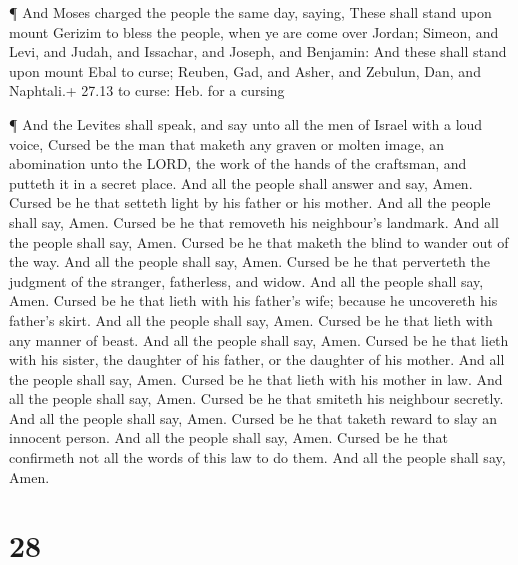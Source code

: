  ¶ And Moses charged the people the same day, saying,
 These shall stand upon mount Gerizim to bless the people,
when ye are come over Jordan; Simeon, and Levi, and Judah, and Issachar,
and Joseph, and Benjamin:  And these shall stand upon mount
Ebal to curse; Reuben, Gad, and Asher, and Zebulun, Dan, and Naphtali.+
27.13 to curse: Heb. for a cursing

 ¶ And the Levites shall speak, and say unto all the men of
Israel with a loud voice,  Cursed be the man that maketh
any graven or molten image, an abomination unto the LORD, the work of
the hands of the craftsman, and putteth it in a secret place. And all
the people shall answer and say, Amen.  Cursed be he that
setteth light by his father or his mother. And all the people shall say,
Amen.  Cursed be he that removeth his neighbour's landmark.
And all the people shall say, Amen.  Cursed be he that
maketh the blind to wander out of the way. And all the people shall say,
Amen.  Cursed be he that perverteth the judgment of the
stranger, fatherless, and widow. And all the people shall say, Amen.
 Cursed be he that lieth with his father's wife; because he
uncovereth his father's skirt. And all the people shall say, Amen.
 Cursed be he that lieth with any manner of beast. And all
the people shall say, Amen.  Cursed be he that lieth with
his sister, the daughter of his father, or the daughter of his mother.
And all the people shall say, Amen.  Cursed be he that
lieth with his mother in law. And all the people shall say, Amen.
 Cursed be he that smiteth his neighbour secretly. And all
the people shall say, Amen.  Cursed be he that taketh
reward to slay an innocent person. And all the people shall say, Amen.
 Cursed be he that confirmeth not all the words of this law
to do them. And all the people shall say, Amen.

\hypertarget{section-27}{%
\section{28}\label{section-27}}

